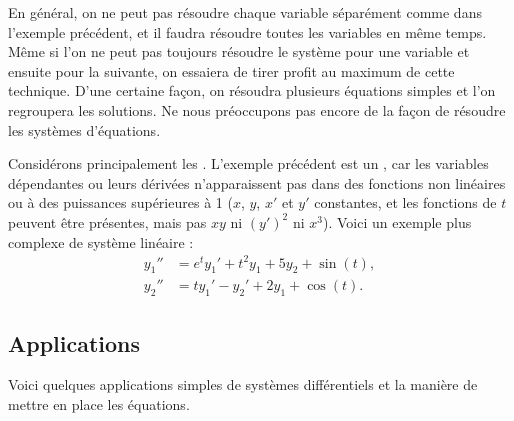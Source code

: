 En général, on ne peut pas résoudre chaque variable séparément comme dans l'exemple précédent, et il faudra résoudre toutes les variables en même temps. Même si l'on ne peut pas toujours résoudre le système pour une variable et ensuite pour la suivante, on essaiera de tirer profit au maximum de cette technique. D'une certaine façon, on résoudra plusieurs équations simples et l'on regroupera les solutions. Ne nous préoccupons pas encore de la façon de résoudre les systèmes d'équations.

Considérons principalement les \emph{}. L'exemple précédent est un \emph{}, car les variables dépendantes ou leurs dérivées n'apparaissent pas dans des fonctions non linéaires ou à des puissances supérieures à 1 ($x$, $y$, $x'$ et $y'$ constantes, et les fonctions de $t$
peuvent être présentes, mais pas $xy$ ni ${(y')}^2$ ni $x^3$). Voici un exemple plus complexe de système linéaire :
\begin{align*}
y_1'' &= e^t y_1' + t^2 y_1 + 5 y_2 + \sin(t), \\
y_2'' &= t y_1'-y_2' + 2 y_1 + \cos(t).
\end{align*}

\subsection{Applications}

Voici quelques applications simples de systèmes différentiels et la manière de mettre en place les équations.

